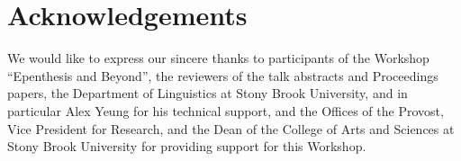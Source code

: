 \documentclass[output=paper,colorlinks,citecolor=brown]{langscibook}
\begin{document}
\section*{Acknowledgements}
We would like to express our sincere thanks to participants of the Workshop “Epenthesis and Beyond”, the reviewers of the talk abstracts and Proceedings papers, the Department of Linguistics at Stony Brook University, and in particular Alex Yeung for his technical support, and the Offices of the Provost, Vice President for Research, and the Dean of the College of Arts and Sciences at Stony Brook University for providing support for this Workshop.


{\sloppy\printbibliography[heading=subbibliography,notkeyword=this]}
\end{document}
